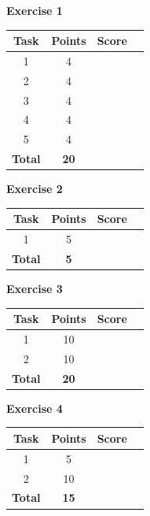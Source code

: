 \documentclass [11pt, a4wide, twoside]{article}
\begin{document}
\begin{minipage}[t]{120pt}
\textbf{Exercise 1}
\vspace{5pt}\\
\begin{tabular}{|c|c|c|c|}
\hline
Task & Points & Score \\\hline
1 & 4 & \\\hline
2 & 4 & \\\hline
3 & 4 & \\\hline
4 & 4 & \\\hline
5 & 4 & \\\hline
\textbf{Total} & \textbf{20} &\\\hline\hline
\end{tabular}
\end{minipage}
\begin{minipage}[t]{120pt}


\textbf{Exercise 2}
\vspace{5pt}\\
\begin{tabular}{|c|c|c|c|}
\hline
Task & Points & Score \\\hline
1 & 5 & \\\hline
\textbf{Total} & \textbf{5} &\\\hline\hline
\end{tabular}
\end{minipage}
\begin{minipage}[t]{120pt}


\textbf{Exercise 3}
\vspace{5pt}\\
\begin{tabular}{|c|c|c|c|}
\hline
Task & Points & Score \\\hline
1 & 10 & \\\hline
2 & 10 & \\\hline
\textbf{Total} & \textbf{20} &\\\hline\hline
\end{tabular}
\end{minipage}
\begin{minipage}[t]{120pt}


\textbf{Exercise 4}
\vspace{5pt}\\
\begin{tabular}{|c|c|c|c|}
\hline
Task & Points & Score \\\hline
1 & 5 & \\\hline
2 & 10 & \\\hline
\textbf{Total} & \textbf{15} &\\\hline\hline
\end{tabular}
\end{minipage}
\end{document}

